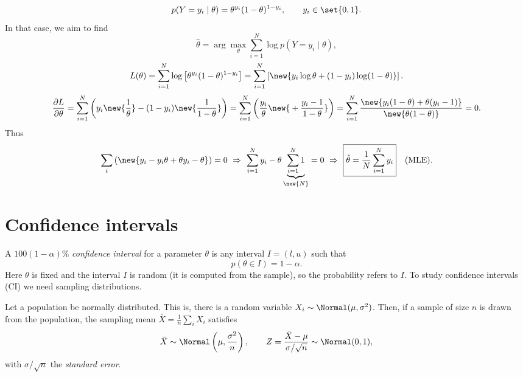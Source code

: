 \begin{example}
\[
p(Y = y_i \mid \theta) = \theta^{y_i}(1-\theta)^{1-y_i}, \qquad y_i \in \set{0,1}.
\]
In that case, we aim to find
\[
\hat\theta = \arg\max_{\theta}\sum_{i=1}^{N}\log p(Y = y_i \mid \theta),
\]
\[
L(\theta) = \sum_{i=1}^{N}\log\left[\theta^{y_i}(1-\theta)^{1-y_i}\right] = \sum_{i=1}^{N}\left[\new{y_i\log\theta + (1-y_i)\log(1-\theta)}\right].
\]
\[
\frac{\partial L}{\partial\theta} = \sum_{i=1}^{N}\left(y_i\new{\frac{1}{\theta}} - (1-y_i)\new{\frac{1}{1-\theta}}\right)
= \sum_{i=1}^{N}\left(\frac{y_i}{\theta} \new{{}+ \frac{y_i - 1}{1-\theta}}\right)
= \sum_{i=1}^{N}\frac{\new{y_i(1-\theta) + \theta(y_i - 1)}}{\new{\theta(1-\theta)}} = 0.
\]
Thus
\[
\sum_{i}\left(\new{y_i - y_i\theta + \theta y_i - \theta}\right) = 0
\ \Rightarrow\
\sum_{i=1}^{N} y_i - \theta\underbrace{\sum_{i=1}^{N} 1}_{\new{N}} = 0
\ \Rightarrow\
\boxed{\hat\theta = \frac{1}{N}\sum_{i=1}^{N} y_i}\quad\text{(MLE)}.
\]
\end{example}

\section{Confidence intervals}
A $100(1-\alpha)\%$ \emph{confidence interval} for a parameter $\theta$ is any interval $I = (l, u)$ such that
\[
p(\theta \in I) = 1 - \alpha.
\]
Here $\theta$ is fixed and the interval $I$ is random (it is computed from the sample), so the probability refers to $I$.
To study confidence intervals (CI) we need sampling distributions.

\begin{theorem}
Let a population be normally distributed. This is, there is a random variable $X_i \sim \Normal(\mu, \sigma^2)$. Then, if a sample of size $n$ is drawn from the population, the sampling mean $\bar X = \frac1n\sum_i X_i$ satisfies
\[
\bar X \sim \Normal\left(\mu, \frac{\sigma^2}{n}\right),
\qquad
Z = \frac{\bar X - \mu}{\sigma/\sqrt n} \sim \Normal(0,1),
\]
with $\sigma/\sqrt n$ the \emph{standard error}.
\end{theorem}

